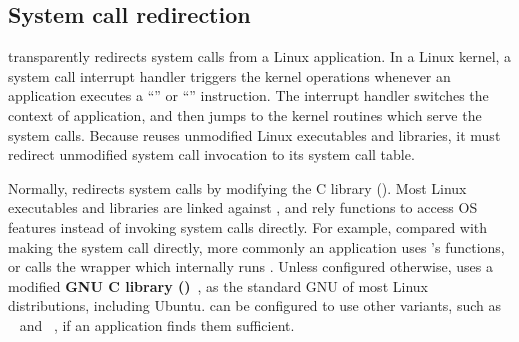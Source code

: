 \subsection{System call redirection}
\label{sec:libos:syscall-redirection}


\thelibos{} transparently redirects system calls from a Linux application. In a Linux kernel, a system call interrupt handler
triggers the kernel operations
whenever an application executes
a ``'' or ``'' instruction.
The interrupt handler
switches the context of application,
and then jumps to the kernel routines which serve the system calls.
Because \thelibos{} reuses
unmodified Linux executables and libraries,
it must redirect
unmodified system call invocation
to its
system call table. %


Normally,
\thelibos{} redirects system calls %
by modifying the C library (\libc{}).
Most Linux executables and libraries
are linked against \libc{},
and rely \libc{} functions to access OS features
instead of
invoking system calls directly.
For example,
compared with making the  system call directly,
more commonly
an application uses \libc{}'s  functions,
or calls the \libc{}  wrapper
which internally runs .
Unless configured otherwise, \thelibos{} uses a modified
{\bf GNU C library (\glibc{})}~\cite{glibc},
as the standard GNU \libc{} of most Linux distributions, including Ubuntu.
\graphene{} can be configured to use other \libc{} variants,
such as ~\cite{uclibc} and ~\cite{musl},
if an application finds them sufficient.




